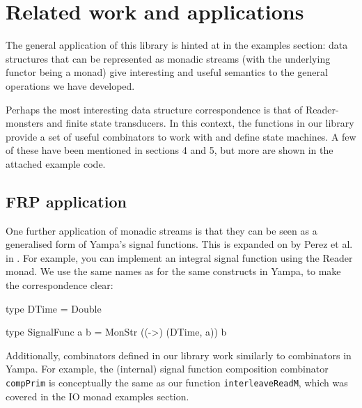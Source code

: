\section{Related work and applications}

The general application of this library is hinted at in the examples section: data structures that can be represented as monadic streams (with the underlying functor being a monad) give interesting and useful semantics to the general operations we have developed. 

Perhaps the most interesting data structure correspondence is that of Reader-monsters and finite state transducers. In this context, the functions in our library provide a set of useful combinators to work with and define state machines. A few of these have been mentioned in sections 4 and 5, but more are shown in the attached example code.

\subsection{FRP application}

One further application of monadic streams is that they can be seen as a generalised form of Yampa's \cite{yampa_arcade} signal functions. This is expanded on by Perez et al. in \cite{frp_refactored}. For example, you can implement an integral signal function using the Reader monad. We use the same names as for the same constructs in Yampa, to make the correspondence clear:

\begin{haskell}
type DTime = Double

type SignalFunc a b = MonStr ((->) (DTime, a)) b
\end{haskell}


Additionally, combinators defined in our library work similarly to combinators in Yampa. For example, the (internal) signal function composition combinator \verb+compPrim+ is conceptually the same as our function \verb+interleaveReadM+, which was covered in the IO monad examples section.

